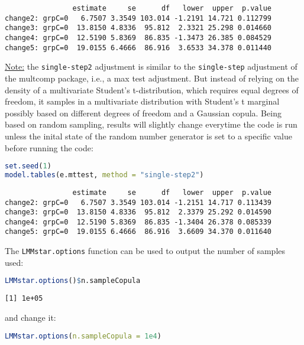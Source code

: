 \documentclass[12pt]{article}
\begin{document}
\label{}
\begin{verbatim}
                estimate     se      df   lower  upper  p.value
change2: grpC=0   6.7507 3.3549 103.014 -1.2191 14.721 0.112799
change3: grpC=0  13.8150 4.8336  95.812  2.3321 25.298 0.014660
change4: grpC=0  12.5190 5.8369  86.835 -1.3473 26.385 0.084529
change5: grpC=0  19.0155 6.4666  86.916  3.6533 34.378 0.011440
\end{verbatim}


\uline{Note:} the \texttt{single-step2} adjustment is similar to the \texttt{single-step}
adjustment of the multcomp package, i.e., a max test adjustment. But
instead of relying on the density of a multivariate Student's
t-distribution, which requires equal degrees of freedom, it samples in
a multivariate distribution with Student's t marginal possibly based
on different degrees of freedom and a Gaussian copula. Being based on
random sampling, results will slightly change everytime the code is
run unless the inital state of the random number generator is set to a
specific value before running the code:

\begin{lstlisting}[language=r,numbers=none]
set.seed(1)
model.tables(e.mttest, method = "single-step2")
\end{lstlisting}

\label{}
\begin{verbatim}
                estimate     se      df   lower  upper  p.value
change2: grpC=0   6.7507 3.3549 103.014 -1.2151 14.717 0.113439
change3: grpC=0  13.8150 4.8336  95.812  2.3379 25.292 0.014590
change4: grpC=0  12.5190 5.8369  86.835 -1.3404 26.378 0.085339
change5: grpC=0  19.0155 6.4666  86.916  3.6609 34.370 0.011640
\end{verbatim}



\hspace{-5mm}\begin{minipage}[t]{0.5\linewidth}
The \texttt{LMMstar.options} function can be used \newline
to output the number of samples used:
\begin{lstlisting}[language=r,numbers=none]
LMMstar.options()$n.sampleCopula
\end{lstlisting}

\label{}
\begin{verbatim}
[1] 1e+05
\end{verbatim}


\end{minipage}
\begin{minipage}[t]{0.45\linewidth}
\hphantom{x} \newline and change it:
\begin{lstlisting}[language=r,numbers=none]
LMMstar.options(n.sampleCopula = 1e4)
\end{lstlisting}
\end{minipage}
\end{document}
